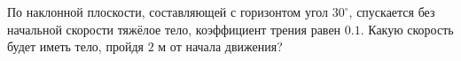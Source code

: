 По наклонной плоскости, составляющей с горизонтом угол $30^\circ$,
спускается без начальной скорости тяжёлое тело, коэффициент трения равен
$0.1$. Какую скорость будет иметь тело, пройдя $2$ м от начала движения?
